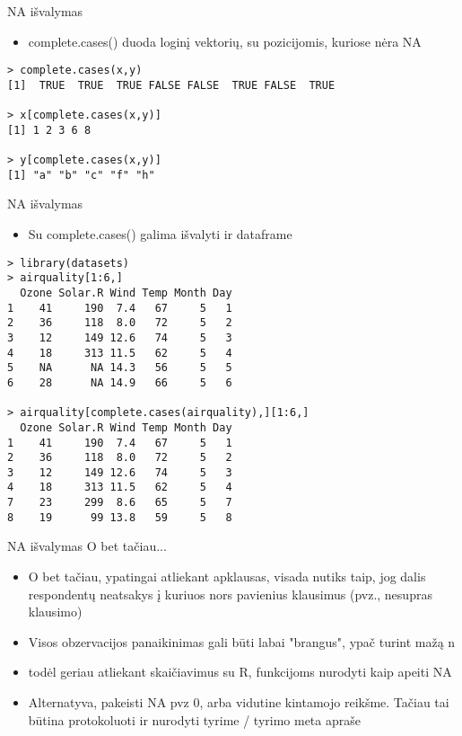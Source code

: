\documentclass[11pt,xcolor=table]{beamer}
\begin{document}

\begin{frame}[fragile]{NA išvalymas}
\begin{itemize}
\item complete.cases() duoda loginį vektorių, su pozicijomis, kuriose nėra NA
\end{itemize}
\begin{lstlisting}
> complete.cases(x,y)
[1]  TRUE  TRUE  TRUE FALSE FALSE  TRUE FALSE  TRUE

> x[complete.cases(x,y)]
[1] 1 2 3 6 8

> y[complete.cases(x,y)]
[1] "a" "b" "c" "f" "h"
\end{lstlisting}
\end{frame}


\begin{frame}[fragile]{NA išvalymas}
\begin{itemize}
\item Su complete.cases() galima išvalyti ir dataframe
\end{itemize}
\begin{lstlisting}
> library(datasets)
> airquality[1:6,]
  Ozone Solar.R Wind Temp Month Day
1    41     190  7.4   67     5   1
2    36     118  8.0   72     5   2
3    12     149 12.6   74     5   3
4    18     313 11.5   62     5   4
5    NA      NA 14.3   56     5   5
6    28      NA 14.9   66     5   6

> airquality[complete.cases(airquality),][1:6,]
  Ozone Solar.R Wind Temp Month Day
1    41     190  7.4   67     5   1
2    36     118  8.0   72     5   2
3    12     149 12.6   74     5   3
4    18     313 11.5   62     5   4
7    23     299  8.6   65     5   7
8    19      99 13.8   59     5   8
\end{lstlisting}
\end{frame}


\begin{frame}[fragile]{NA išvalymas}
O bet tačiau...
\begin{itemize}
\item O bet tačiau, ypatingai atliekant apklausas, visada nutiks taip, jog dalis respondentų neatsakys į kuriuos nors pavienius klausimus (pvz., nesupras klausimo)
\item Visos obzervacijos panaikinimas gali būti labai "brangus", ypač turint mažą n
\item todėl geriau atliekant skaičiavimus su R, funkcijoms nurodyti kaip apeiti NA
\item Alternatyva, pakeisti NA pvz 0, arba vidutine kintamojo reikšme. Tačiau tai būtina protokoluoti ir nurodyti tyrime / tyrimo meta apraše

\end{itemize}
\end{frame}
\end{document}
